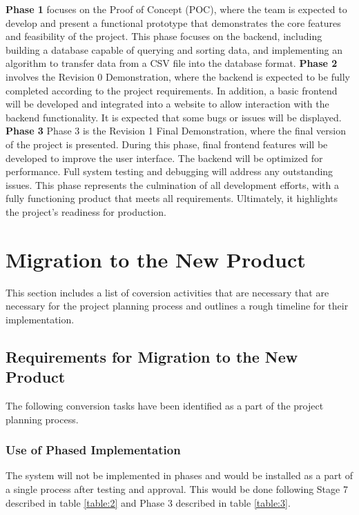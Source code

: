 \documentclass[12pt]{article}
\begin{document}
\noindent\textbf{Phase 1} focuses on the Proof of Concept (POC), where the team
is expected to develop and present a functional prototype that demonstrates the
core features and feasibility of the project. This phase focuses on the backend,
including building a database capable of querying and sorting data, and
implementing an algorithm to transfer data from a CSV file into the database
format.\newline\newline
\noindent\textbf{Phase 2} involves the Revision 0 Demonstration, where the
backend is expected to be fully completed according to the project requirements.
In addition, a basic frontend will be developed and integrated into a website to
allow interaction with the backend functionality. It is expected that some bugs
or issues will be displayed. \newline\newline
\noindent\textbf{Phase 3} Phase 3 is the Revision 1 Final Demonstration, where
the final version of the project is presented. During this phase, final frontend
features will be developed to improve the user interface. The backend will be
optimized for performance. Full system testing and debugging will address any
outstanding issues.  This phase represents the culmination of all development
efforts, with a fully functioning product that meets all requirements.
Ultimately, it highlights the project's readiness for production.

\section{Migration to the New Product}
This section includes a list of coversion activities that are necessary that are necessary for the project planning process and outlines a rough timeline for their implementation.
\subsection{Requirements for Migration to the New Product}
The following conversion tasks have been identified as a part of the project planning process.
\subsubsection{Use of Phased Implementation}
The system will not be implemented in phases and would be installed as a part of a single process after testing and approval. This would be done following Stage 7 described in table
\ref{table:2} and Phase 3 described in table \ref{table:3}.
\end{document}
